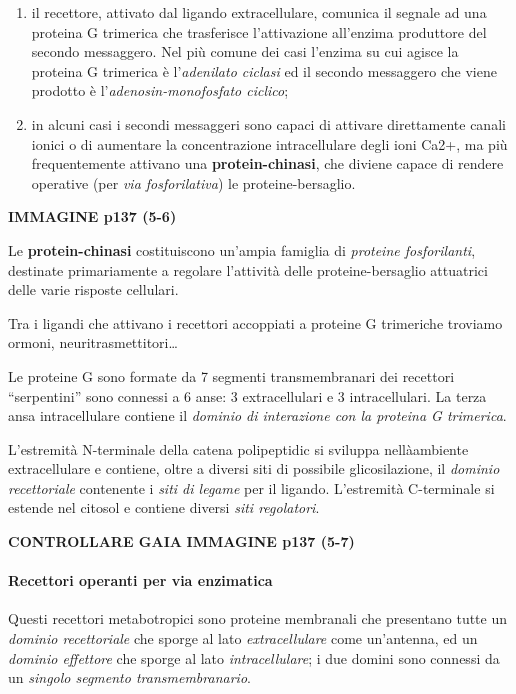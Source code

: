 \documentclass[]{article}
\begin{document}
\begin{enumerate}
\def\labelenumi{\arabic{enumi}.}
\itemsep1pt\parskip0pt
\item
  il recettore, attivato dal ligando extracellulare, comunica il segnale
  ad una proteina G trimerica che trasferisce l'attivazione all'enzima
  produttore del secondo messaggero. Nel più comune dei casi l'enzima su
  cui agisce la proteina G trimerica è l'\emph{adenilato ciclasi} ed il
  secondo messaggero che viene prodotto è l'\emph{adenosin-monofosfato
  ciclico};
\item
  in alcuni casi i secondi messaggeri sono capaci di attivare
  direttamente canali ionici o di aumentare la concentrazione
  intracellulare degli ioni Ca2+, ma più frequentemente attivano una
  \textbf{protein-chinasi}, che diviene capace di rendere operative (per
  \emph{via fosforilativa}) le proteine-bersaglio.
\end{enumerate}

\textbf{IMMAGINE p137 (5-6)}

Le \textbf{protein-chinasi} costituiscono un'ampia famiglia di
\emph{proteine fosforilanti}, destinate primariamente a regolare
l'attività delle proteine-bersaglio attuatrici delle varie risposte
cellulari.

Tra i ligandi che attivano i recettori accoppiati a proteine G
trimeriche troviamo ormoni, neuritrasmettitori\ldots{}

Le proteine G sono formate da 7 segmenti transmembranari dei recettori
``serpentini'' sono connessi a 6 anse: 3 extracellulari e 3
intracellulari. La terza ansa intracellulare contiene il \emph{dominio
di interazione con la proteina G trimerica}.

L'estremità N-terminale della catena polipeptidic si sviluppa
nellàambiente extracellulare e contiene, oltre a diversi siti di
possibile glicosilazione, il \emph{dominio recettoriale} contenente i
\emph{siti di legame} per il ligando. L'estremità C-terminale si estende
nel citosol e contiene diversi \emph{siti regolatori}.

\textbf{CONTROLLARE GAIA} \textbf{IMMAGINE p137 (5-7)}

\paragraph{Recettori operanti per via
enzimatica}\label{recettori-operanti-per-via-enzimatica}

Questi recettori metabotropici sono proteine membranali che presentano
tutte un \emph{dominio recettoriale} che sporge al lato
\emph{extracellulare} come un'antenna, ed un \emph{dominio effettore}
che sporge al lato \emph{intracellulare}; i due domini sono connessi da
un \emph{singolo segmento transmembranario}.
\end{document}
